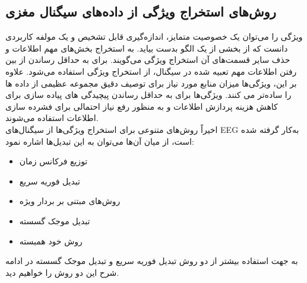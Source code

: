 \subsection{روش‌‌های استخراج ویژگی از داده‌های سیگنال مغزی}
ویژگی را می‌توان یک خصوصیت متمایز، اندازه‌گیری قابل تشخیص و یک مولفه کاربردی دانست که از بخشی از یک الگو بدست بیاید. به استخراج بخش‌های مهم اطلاعات و حذف  سایر قسمت‌های آن استخراج ویژگی  می‌گویند. برای به حداقل رساندن از بین رفتن اطلاعات مهم تعبیه شده در سیگنال، از استخراج ویژگی استفاده می‌شود. علاوه بر این، ویژگی‌ها میزان منابع مورد نیاز برای توصیف دقیق مجموعه عظیمی از داده ها را ساده‌تر می کنند. ویژگی‌ها برای به حداقل رساندن پیچیدگی های پیاده سازی برای کاهش هزینه پردازش اطلاعات و به منظور رفع نیاز احتمالی برای فشرده سازی اطلاعات استفاده می‌شوند.
\cite{al2014methods}
\\
اخیراً روش‌های متنوعی برای استخراج ویژگی‌ها از سیگنال‌های EEG به‌کار گرفته شده است، از میان آن‌ها می‌توان به این تبدیل‌ها اشاره نمود:
\begin{itemize}
	\item توزیع فرکانس زمان
	\item تبدیل فوریه سریع
	\item روش‌های مبتنی بر بردار ویژه
	\item تبدیل موجک گسسته
	\item روش‌ خود همبسته
\end{itemize}
به جهت استفاده بیشتر از دو روش تبدیل فوریه سریع و تبدیل موجک گسسته در ادامه شرح این دو روش را خواهیم دید.
